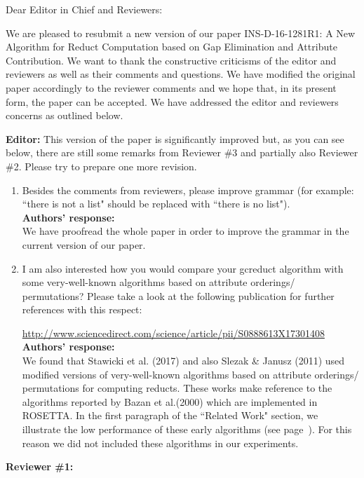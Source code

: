 \documentclass{letter}
\begin{document}
\begin{letter}{}
  \opening{Dear Editor in Chief and Reviewers:}

  We are pleased to resubmit a new version of our paper INS-D-16-1281R1: A New Algorithm for Reduct Computation based on Gap Elimination and Attribute Contribution. We want to thank the constructive criticisms of the editor and reviewers as well as their comments and questions. We have modified the original paper accordingly to the reviewer comments and we hope that, in its present form, the paper can be accepted. We have addressed the editor and reviewers concerns as outlined below.

  \textbf{Editor:} 
  This version of the paper is significantly improved but, as you can see below, there are still some remarks from Reviewer \#3 and partially also Reviewer \#2. Please try to prepare one more revision.
  \begin{enumerate}
	\item Besides the comments from reviewers, please improve grammar (for example: ``there is not a list" should be replaced with ``there is no list"). \\
	\textbf{Authors’ response:} \\
	We have proofread the whole paper in order to improve the grammar in the current version of our paper.
		 
	\item I am also interested how you would compare your gcreduct algorithm with some very-well-known algorithms based on attribute orderings/ permutations? Please take a look at the following publication for further references with this respect:
  
	\small{\url{ http://www.sciencedirect.com/science/article/pii/S0888613X17301408}}\\
	\normalsize
	\textbf{Authors’ response:} \\
	We found that Stawicki et al. (2017) and also Slezak \& Janusz (2011) used modified versions of very-well-known algorithms based on attribute orderings/ permutations for computing reducts. These works make reference to the algorithms reported by Bazan et al.(2000) which are implemented in ROSETTA. In the first paragraph of the ``Related Work" section, we illustrate the low performance of these early algorithms (see page~\pageref{early}). For this reason we did not included these algorithms in our experiments.
  \end{enumerate}
  
  \textbf{Reviewer \#1:}
  

\end{letter}
\end{document}
